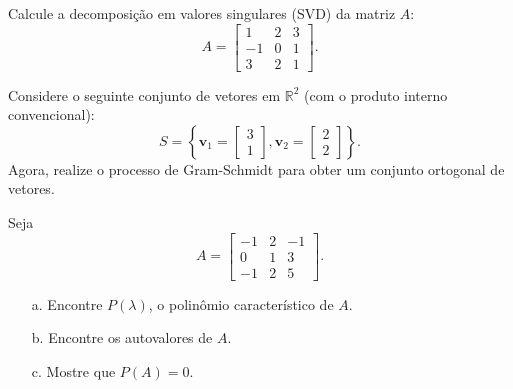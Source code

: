 \begin{resolution}

\end{resolution}

\begin{question}
  Calcule a decomposição em valores singulares (SVD) da matriz $A$:
  \[
    A = \begin{bmatrix}
      1  & 2 & 3 \\
      -1 & 0 & 1 \\
      3  & 2 & 1
    \end{bmatrix}.
  \]
\end{question}

\begin{resolution}

\end{resolution}

\begin{question}
  Considere o seguinte conjunto de vetores em $\mathbb{R}^2$ (com o produto interno convencional):
  \[
    S = \left\{ \mathbf{v}_1 =
    \begin{bmatrix}
      3 \\
      1
    \end{bmatrix}, \mathbf{v}_2 =
    \begin{bmatrix}
      2 \\
      2
    \end{bmatrix} \right\}.
  \]
  Agora, realize o processo de Gram-Schmidt para obter um conjunto ortogonal de vetores.
\end{question}

\begin{resolution}

\end{resolution}

\begin{question}
  Seja
  \[
    A =
    \begin{bmatrix}
      -1 & 2 & -1 \\
      0  & 1 & 3  \\
      -1 & 2 & 5
    \end{bmatrix}.
  \]
  \begin{itemize}
    \item[a.] Encontre $P(\lambda)$, o polinômio característico de $A$.
    \item[b.] Encontre os autovalores de $A$.
    \item[c.] Mostre que $P(A) = 0$.
  \end{itemize}

\end{question}

